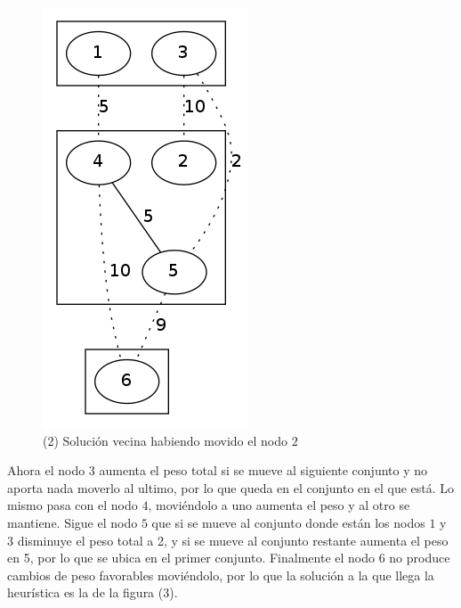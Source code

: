\begin{figure}[H]
\begin{center}
\includegraphics[scale=0.4]{./img/local2.png}
\caption{(2) Solución vecina habiendo movido el nodo $2$}
\end{center}
\end{figure}


Ahora el nodo $3$ aumenta el peso total si se mueve al siguiente conjunto y no aporta nada moverlo al ultimo, por lo que queda en el conjunto en el que está. Lo mismo pasa con el nodo $4$, moviéndolo a uno aumenta el peso y al otro se mantiene. Sigue el nodo $5$ que si se mueve al conjunto donde están los nodos $1$ y $3$ disminuye el peso total a 2, y si se mueve al conjunto restante aumenta el peso en 5, por lo que se ubica en el primer conjunto. Finalmente el nodo $6$ no produce cambios de peso favorables moviéndolo, por lo que la solución a la que llega la heurística es la de la figura (3).

